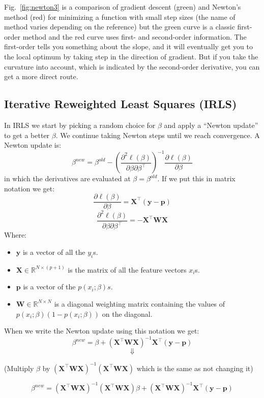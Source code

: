 \documentclass[a4paper]{article}
\begin{document}
Fig.\ \ref{fig:newton3} is a comparison of gradient descent (green) and Newton's method (red) for minimizing a function with small step sizes (the name of method varies depending on the reference) but the green curve is a classic first-order method and the red curve uses first- and second-order information. The first-order tells you something about the slope, and it will eventually get you to the local optimum by taking step in the direction of gradient. But if you take the curvature into account, which is indicated by the second-order derivative, you can get a more direct route. 


\subsection{Iterative Reweighted Least Squares (IRLS)}
In IRLS we start by picking a random choice for $\beta$ and apply a ``Newton update'' to get a better $\beta$. We continue taking Newton steps until we reach convergence. 
A Newton update is:
$$\beta^{new} = \beta^{old} - \left(\frac{\partial^2 \ell(\beta)}{\partial \beta\partial \beta^\top}\right)^{-1}\frac{\partial \ell(\beta)}{\partial \beta}$$
in which the derivatives are evaluated at $\beta=\beta^{old}$.  If we put this in matrix notation we get:
$$\frac{\partial \ell(\beta)}{\partial \beta} = \mathbf{X}^\top(\mathbf{y}-\mathbf{p})$$
$$\frac{\partial^2 \ell(\beta)}{\partial \beta\partial \beta^\top} = -\mathbf{X}^\top \mathbf{W}\mathbf{X}$$
Where:
\begin{itemize}
  \item $\mathbf{y}$ is a vector of all the $y_i$s.
  \item $\mathbf{X}\in\mathbb{R}^{N\times (p+1)}$ is the matrix of all the feature vectors $x_i$s.
  \item $\mathbf{p}$ is a vector of the $p(x_i;\beta)s$.
  \item $\mathbf{W}\in\mathbb{R}^{N\times N}$ is a diagonal weighting matrix containing the values of $p(x_i;\beta)(1-p(x_i;\beta))$ on the diagonal.
\end{itemize}
When we write the Newton update using this notation we get:
$$\beta^{new} = \beta+(\mathbf{X}^\top \mathbf{W}\mathbf{X})^{-1}\mathbf{X}^\top(\mathbf{y}-\mathbf{p})$$
$$\Downarrow$$
\begin{center}{(Multiply $\beta$ by $(\mathbf{X}^\top \mathbf{W}\mathbf{X})^{-1}(\mathbf{X}^\top \mathbf{W}\mathbf{X})$ which is the same as not changing it)}\end{center}
$$\beta^{new} = (\mathbf{X}^\top \mathbf{W}\mathbf{X})^{-1}(\mathbf{X}^\top \mathbf{W}\mathbf{X})\beta+(\mathbf{X}^\top \mathbf{W}\mathbf{X})^{-1}\mathbf{X}^\top(\mathbf{y}-\mathbf{p})$$
\end{document}
